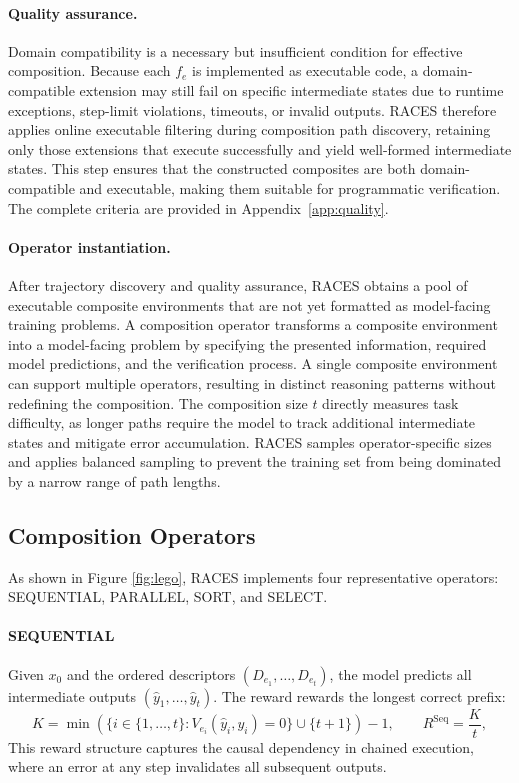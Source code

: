 \paragraph{Quality assurance.}
Domain compatibility is a necessary but insufficient condition for effective composition.
Because each $f_e$ is implemented as executable code, a domain-compatible extension may still fail on specific intermediate states due to runtime exceptions, step-limit violations, timeouts, or invalid outputs.
RACES therefore applies online executable filtering during composition path discovery, retaining only those extensions that execute successfully and yield well-formed intermediate states.
This step ensures that the constructed composites are both domain-compatible and executable, making them suitable for programmatic verification. The complete criteria are provided in Appendix~\ref{app:quality}.

\paragraph{Operator instantiation.}
After trajectory discovery and quality assurance, RACES obtains a pool of executable composite environments that are not yet formatted as model-facing training problems.
A composition operator transforms a composite environment into a model-facing problem by specifying the presented information, required model predictions, and the verification process. A single composite environment can support multiple operators, resulting in distinct reasoning patterns without redefining the composition. The composition size $t$ directly measures task difficulty, as longer paths require the model to track additional intermediate states and mitigate error accumulation. RACES samples operator-specific sizes and applies balanced sampling to prevent the training set from being dominated by a narrow range of path lengths.

\subsection{Composition Operators}
\label{sec:operators}

As shown in Figure \ref{fig:lego}, RACES implements four representative operators: SEQUENTIAL, PARALLEL, SORT, and SELECT.

\paragraph{SEQUENTIAL}
Given $x_0$ and the ordered descriptors $(D_{e_1},\ldots,D_{e_t})$, the model predicts all intermediate outputs $(\hat y_1,\ldots,\hat y_t)$. The reward rewards the longest correct prefix:
\begin{equation}
K = \min\left(\{i\in\{1,\ldots,t\}:V_{e_i}(\hat y_i,y_i)=0\}\cup\{t+1\}\right)-1, \qquad R^{\mathrm{Seq}}=\frac{K}{t},
\label{eq:seq_reward}
\end{equation}
This reward structure captures the causal dependency in chained execution, where an error at any step invalidates all subsequent outputs.

